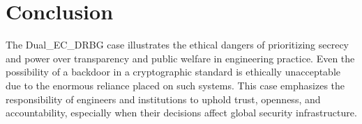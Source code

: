 \documentclass[12pt,letterpaper]{article}
\begin{document}


\section{Conclusion}
The Dual\_EC\_DRBG case illustrates the ethical dangers of prioritizing secrecy and power over transparency and public welfare in engineering practice. Even the possibility of a backdoor in a cryptographic standard is ethically unacceptable due to the enormous reliance placed on such systems. This case emphasizes the responsibility of engineers and institutions to uphold trust, openness, and accountability, especially when their decisions affect global security infrastructure.

\end{document}
